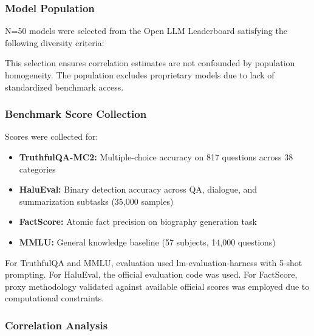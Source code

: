 
\subsubsection{Model Population}

N=50 models were selected from the Open LLM Leaderboard satisfying the following diversity criteria:

\begin{table}[htbp]
\centering
{}
\end{table}

This selection ensures correlation estimates are not confounded by population homogeneity. The population excludes proprietary models due to lack of standardized benchmark access.

\subsubsection{Benchmark Score Collection}

Scores were collected for:

\begin{itemize}
\item \textbf{TruthfulQA-MC2:} Multiple-choice accuracy on 817 questions across 38 categories
\item \textbf{HaluEval:} Binary detection accuracy across QA, dialogue, and summarization subtasks (35,000 samples)
\item \textbf{FactScore:} Atomic fact precision on biography generation task
\item \textbf{MMLU:} General knowledge baseline (57 subjects, 14,000 questions)
\end{itemize}

For TruthfulQA and MMLU, evaluation used lm-evaluation-harness with 5-shot prompting. For HaluEval, the official evaluation code was used. For FactScore, proxy methodology validated against available official scores was employed due to computational constraints.

\subsubsection{Correlation Analysis}

